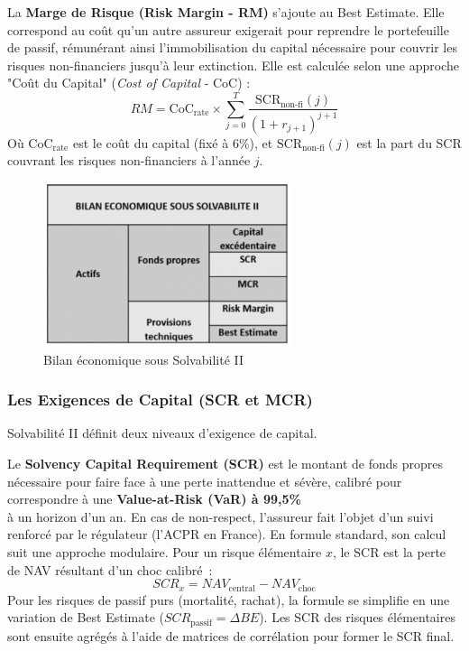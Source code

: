 \bigskip

La \textbf{Marge de Risque (Risk Margin - RM)} s'ajoute au Best Estimate. Elle correspond au coût qu'un autre assureur exigerait pour reprendre le portefeuille de passif, rémunérant ainsi l'immobilisation du capital nécessaire pour couvrir les risques non-financiers jusqu'à leur extinction. Elle est calculée selon une approche "Coût du Capital" (\textit{Cost of Capital} - CoC) :
\begin{equation}
    RM = \text{CoC}_{\text{rate}} \times \sum_{j=0}^{T} \frac{\text{SCR}_{\text{non-fi}}(j)}{(1+r_{j+1})^{j+1}}
\end{equation}
Où $\text{CoC}_{\text{rate}}$ est le coût du capital (fixé à 6\%), et $\text{SCR}_{\text{non-fi}}(j)$ est la part du SCR couvrant les risques non-financiers à l'année $j$.

\begin{figure}[H]
    \centering
    \includegraphics[width=0.65\textwidth]{images/2_chapitres/chapitre1/bilanS2.png}
    \caption{Bilan économique sous Solvabilité II}
    \label{fig:Bilan économique sous Solvabilité II}
\end{figure}


\subsubsection{Les Exigences de Capital (SCR et MCR)}

Solvabilité II définit deux niveaux d'exigence de capital.

\bigskip

Le \textbf{Solvency Capital Requirement (SCR)} est le montant de fonds propres nécessaire pour faire face à une perte inattendue et sévère, calibré pour correspondre à une \textbf{Value-at-Risk (VaR) à 99,5\%}\\ à un horizon d'un an. En cas de non-respect, l'assureur fait l'objet d'un suivi renforcé par le régulateur (l'ACPR en France). En formule standard, son calcul suit une approche modulaire. Pour un risque élémentaire $x$, le SCR est la perte de NAV résultant d'un choc calibré~:
\begin{equation}
    SCR_{x} = NAV_{\text{central}} - NAV_{\text{choc}}
\end{equation}
Pour les risques de passif purs (mortalité, rachat), la formule se simplifie en une variation de Best Estimate ($SCR_{\text{passif}} = \Delta BE$). Les SCR des risques élémentaires sont ensuite agrégés à l'aide de matrices de corrélation pour former le SCR final.

